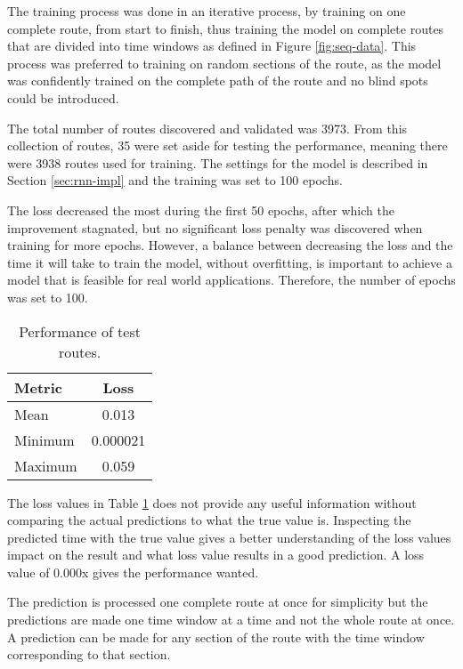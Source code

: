 \documentclass[../main.tex]{subfiles}
\begin{document}
The training process was done in an iterative process, by training on one complete route, from start to finish, thus training the model on complete routes that are divided into time windows as defined in Figure \ref{fig:seq-data}. This process was preferred to training on random sections of the route, as the model was confidently trained on the complete path of the route and no blind spots could be introduced.

The total number of routes discovered and validated was 3973. From this collection of routes, 35 were set aside for testing the performance, meaning there were 3938 routes used for training. The settings for the model is described in Section \ref{sec:rnn-impl} and the training was set to 100 epochs.

The loss decreased the most during the first 50 epochs, after which the improvement stagnated, but no significant loss penalty was discovered when training for more epochs. However, a balance between decreasing the loss and the time it will take to train the model, without overfitting, is important to achieve a model that is feasible for real world applications. Therefore, the number of epochs was set to 100.

\begin{table}[H]
\centering
\begin{tabular}{|l|c|}
\hline
\textbf{Metric} & \textbf{Loss} \\ \hline
Mean            & 0.013         \\ \hline
Minimum         & 0.000021      \\ \hline
Maximum         & 0.059         \\ \hline
\end{tabular}
\caption{Performance of test routes.}
\label{tab:loss-perf}
\end{table}

The loss values in Table \ref{tab:loss-perf} does not provide any useful information without comparing the actual predictions to what the true value is. Inspecting the predicted time with the true value gives a better understanding of the loss values impact on the result and what loss value results in a good prediction. A loss value of 0.000x gives the performance wanted.

The prediction is processed one complete route at once for simplicity but the predictions are made one time window at a time and not the whole route at once. A prediction can be made for any section of the route with the time window corresponding to that section.
\end{document}
